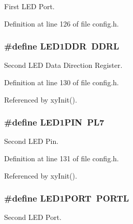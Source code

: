 First L\-E\-D Port. 



Definition at line 126 of file config.\-h.

\hypertarget{group__config_gab0f33b52cdb68e643eba6cf583fb625f}{
\subsubsection[{L\-E\-D1\-D\-D\-R}]{\setlength{\rightskip}{0pt plus 5cm}\#define L\-E\-D1\-D\-D\-R~D\-D\-R\-L}}\label{group__config_gab0f33b52cdb68e643eba6cf583fb625f}


Second L\-E\-D Data Direction Register. 



Definition at line 130 of file config.\-h.



Referenced by xy\-Init().

\hypertarget{group__config_ga04d7aaffbb7b5afaf49acf8a3a39e33a}{
\subsubsection[{L\-E\-D1\-P\-I\-N}]{\setlength{\rightskip}{0pt plus 5cm}\#define L\-E\-D1\-P\-I\-N~P\-L7}}\label{group__config_ga04d7aaffbb7b5afaf49acf8a3a39e33a}


Second L\-E\-D Pin. 



Definition at line 131 of file config.\-h.



Referenced by xy\-Init().

\hypertarget{group__config_ga3931891a757b08dbdfeaa8afd4dcb664}{
\subsubsection[{L\-E\-D1\-P\-O\-R\-T}]{\setlength{\rightskip}{0pt plus 5cm}\#define L\-E\-D1\-P\-O\-R\-T~P\-O\-R\-T\-L}}\label{group__config_ga3931891a757b08dbdfeaa8afd4dcb664}


Second L\-E\-D Port. 



